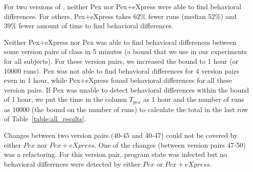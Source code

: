  For two versions of , neither Pex nor Pex+eXpress were able to find behavioral differences. 
 For others, Pex+eXpress takes 62\% fewer runs (median 52\%) and 39\% fewer amount of time to find behavioral differences. 
 
 	Neither Pex+eXpress nor Pex was able to find behavioral differences between some version pairs of class  in 5 minutes (a bound that we use in our experiments for all subjects). For these version pairs, we increased the bound to 1 hour (or 10000 runs). Pex was not able to find behavioral differences for 4 version pairs even in 1 hour, while Pex+eXpress found behavioral differences for all these version pairs. If Pex was unable to detect behavioral differences within the bound of 1 hour, we put the time in the column $T_{pex}$ as 1 hour 
 	and the number of runs as 10000 (the bound on the number of runs) to calculate the total in the last row of Table~\ref{table:all_results}.
 	
  Changes between two version pairs (40-45 and 40-47) could not be covered by either $Pex$ nor $Pex+eXpress$. One of the changes (between version pairs 47-50) was a refactoring. For this version pair, program state was infected but no behavioral differences were detected by either $Pex$ or $Pex+eXpress$.
   
